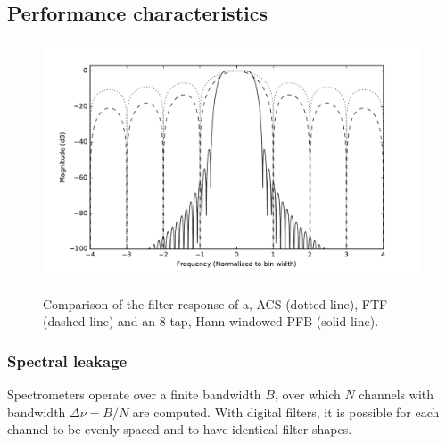 \documentclass{ws-rv961x669}
\begin{document}


\subsection{Performance characteristics}

\begin{figure}
 \centering
 \includegraphics[width=\textwidth]{./figures/fb_comparison}
 \label{fig:pfb_response}
 \caption{Comparison of the filter response of a, ACS (dotted line), FTF (dashed line) and an 8-tap, Hann-windowed PFB (solid line).\label{fig:leakage}}
\end{figure}


\subsubsection{Spectral leakage}
Spectrometers operate over a finite bandwidth $B$, over which $N$ channels with bandwidth $\Delta\nu = B/N$ are computed. With digital filters, it is possible for each channel to be evenly spaced and to have identical filter shapes. 
\end{document}
